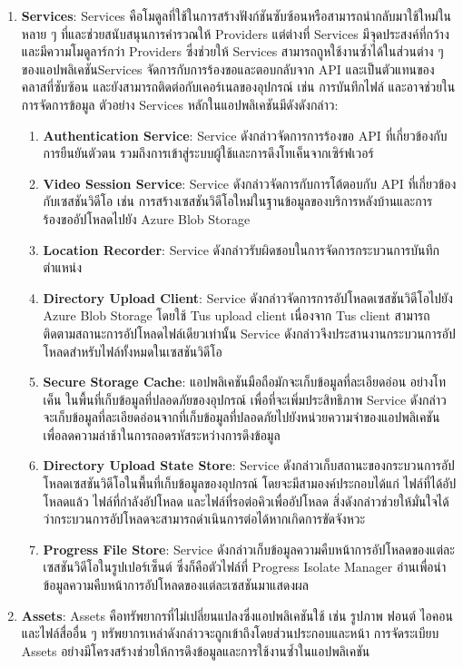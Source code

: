 \begin{enumerate}
    \item \textbf{Services}: Services คือโมดูลที่ใช้ในการสร้างฟังก์ชันซับซ้อนหรือสามารถนำกลับมาใช้ใหม่ในหลาย ๆ ที่และช่วยสนับสนุนการคำรวณให้ Providers แต่ต่างที่ Services มีจุดประสงค์ที่กว้างและมีความโมดูลาร์กว่า Providers ซึ่งช่วยให้ Services สามารถถูหใช้งานซ้ำได้ในส่วนต่าง ๆ ของแอปพลิเคชัน\enskip Services จัดการกับการร้องขอและตอบกลับจาก API และเป็นตัวแทนของคลาสที่ซับซ้อน และยังสามารถติดต่อกับเคอร์เนลของอุปกรณ์ เช่น การบันทึกไฟล์ และอาจช่วยในการจัดการข้อมูล ตัวอย่าง Services หลักในแอปพลิเคชันมีดังดังกล่าว:
    \begin{enumerate}  
        \item \textbf{Authentication Service}: Service ดังกล่าวจัดการการร้องขอ API ที่เกี่ยวข้องกับการยืนยันตัวตน รวมถึงการเข้าสู่ระบบผู้ใช้และการดึงโทเค็นจากเซิร์ฟเวอร์  
        \item \textbf{Video Session Service}: Service ดังกล่าวจัดการกับการโต้ตอบกับ API ที่เกี่ยวข้องกับเซสชันวิดีโอ เช่น การสร้างเซสชันวิดีโอใหม่ในฐานข้อมูลของบริการหลังบ้านและการร้องขออัปโหลดไปยัง Azure Blob Storage  
        \item \textbf{Location Recorder}: Service ดังกล่าวรับผิดชอบในการจัดการกระบวนการบันทึกตำแหน่ง 
        \item \textbf{Directory Upload Client}: Service ดังกล่าวจัดการการอัปโหลดเซสชันวิดีโอไปยัง Azure Blob Storage โดยใช้ Tus upload client เนื่องจาก Tus client สามารถติดตามสถานะการอัปโหลดไฟล์เดียวเท่านั้น Service ดังกล่าวจึงประสานงานกระบวนการอัปโหลดสำหรับไฟล์ทั้งหมดในเซสชันวิดีโอ  
        \item \textbf{Secure Storage Cache}: แอปพลิเคชันมือถือมักจะเก็บข้อมูลที่ละเอียดอ่อน อย่างโทเค็น ในพื้นที่เก็บข้อมูลที่ปลอดภัยของอุปกรณ์ เพื่อที่จะเพิ่มประสิทธิภาพ Service ดังกล่าวจะเก็บข้อมูลที่ละเอียดอ่อนจากที่เก็บข้อมูลที่ปลอดภัยไปยังหน่วยความจำของแอปพลิเคชันเพื่อลดความล่าช้าในการถอดรหัสระหว่างการดึงข้อมูล  
        \item \textbf{Directory Upload State Store}: Service ดังกล่าวเก็บสถานะของกระบวนการอัปโหลดเซสชันวิดีโอในพื้นที่เก็บข้อมูลของอุปกรณ์ โดยจะมีสามองค์ประกอบได้แก่ ไฟล์ที่ได้อัปโหลดแล้ว ไฟล์ที่กำลังอัปโหลด และไฟล์ที่รอต่อคิวเพื่ออัปโหลด สิ่งดังกล่าวช่วยให้มั่นใจได้ว่ากระบวนการอัปโหลดจะสามารถดำเนินการต่อได้หากเกิดการขัดจังหวะ  
        \item \textbf{Progress File Store}: Service ดังกล่าวเก็บข้อมูลความคืบหน้าการอัปโหลดของแต่ละเซสชันวิดีโอในรูปเปอร์เซ็นต์ ซึ่งก็คือตัวไฟล์ที่ Progress Isolate Manager อ่านเพื่อนำข้อมูลความคืบหน้าการอัปโหลดของแต่ละเซสชันมาแสดงผล
    \end{enumerate}  
    
    \item \textbf{Assets}: Assets คือทรัพยากรที่ไม่เปลี่ยนแปลงซึ่งแอปพลิเคชันใช้ เช่น รูปภาพ ฟอนต์ ไอคอน และไฟล์สื่ออื่น ๆ ทรัพยากรเหล่าดังกล่าวจะถูกเข้าถึงโดยส่วนประกอบและหน้า การจัดระเบียบ Assets อย่างมีโครงสร้างช่วยให้การดึงข้อมูลและการใช้งานซ้ำในแอปพลิเคชัน
\end{enumerate}
\fi
